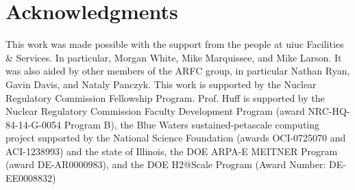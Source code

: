 \section{Acknowledgments}
This work was made possible with the support from the people at \gls{uiuc}
Facilities \& Services. In particular, Morgan White, Mike Marquissee, and Mike
Larson. It was also aided by other members of the \gls{ARFC} group, in
particular Nathan Ryan, Gavin Davis, and Nataly Panczyk.
This work is supported by the Nuclear Regulatory Commission Fellowship Program.
Prof. Huff is supported by the Nuclear Regulatory Commission Faculty
Development Program (award NRC-HQ-84-14-G-0054 Program B), the Blue Waters
sustained-petascale computing project supported by the National Science
Foundation (awards OCI-0725070 and ACI-1238993) and the state of Illinois, the
DOE ARPA-E MEITNER Program (award DE-AR0000983), and the DOE H2@Scale Program
(Award Number: DE-EE0008832)
